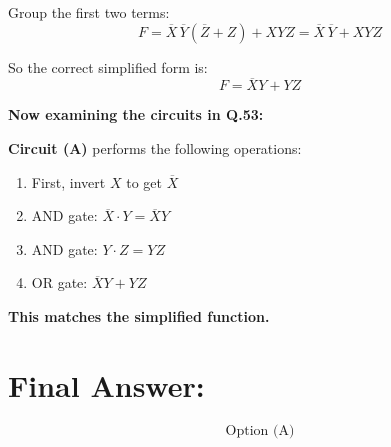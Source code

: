 \documentclass[a4paper,12pt]{article}
\begin{document}
Group the first two terms:
\[
F = \overline{X} \, \overline{Y} (\overline{Z} + Z) + X Y Z = \overline{X} \, \overline{Y} + X Y Z
\]

So the correct simplified form is:
\[
\boxed{F = \overline{X} Y + Y Z}
\]

\textbf{Now examining the circuits in Q.53:}

\textbf{Circuit (A)} performs the following operations:
\begin{enumerate}
    \item First, invert \( X \) to get \( \overline{X} \)
    \item AND gate: \( \overline{X} \cdot Y = \overline{X} Y \)
    \item AND gate: \( Y \cdot Z = Y Z \)
    \item OR gate: \( \overline{X} Y + Y Z \)
\end{enumerate}
\textbf{This matches the simplified function.}

\section*{Final Answer:}
\[
\boxed{\text{Option (A)}}
\]
\end{document}
